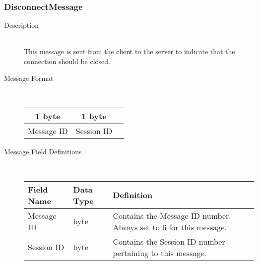 \documentclass[12pt,letterpaper,titlepage]{article}
\begin{document}
\subsubsection{DisconnectMessage}
	\begin{description}
	\item[Description] \hfill \\
		This message is sent from the client to the server to indicate that the connection should be closed.
	\item[Message Format] \hfill \\
	\begin{tabular}{ | c | c | c | }
		\hline
		1 byte & 1 byte \\
		\hline
		Message ID & Session ID \\
		\hline
	\end{tabular}
	\item[Message Field Definitions] \hfill \\
	\begin{tabular}{ | p{3cm} | p{1cm} | p{8cm} | }
		\hline
		Field Name & Data Type & Definition \\
		\hline
		Message ID & byte & Contains the Message ID number. 
					\newline Always set to 6 for this message. \\
		\hline
		Session ID & byte & Contains the Session ID number pertaining to this message. \\
		\hline
	\end{tabular}
	\end{description}
\end{document}
